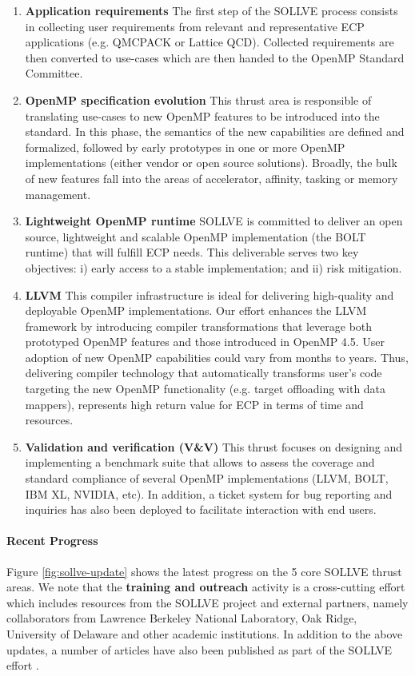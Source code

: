 \begin{enumerate}
\item {\bf Application requirements}
The first step of the SOLLVE process consists in collecting user requirements
from relevant and representative ECP applications (e.g. QMCPACK or Lattice QCD).
Collected requirements are then converted to use-cases which are then handed
to the OpenMP Standard Committee.
\item {\bf OpenMP specification evolution}
This thrust area is responsible of translating use-cases to new OpenMP
features to be introduced into the standard. In this phase, the semantics
of the new capabilities are defined and formalized, followed by early
prototypes in one or more OpenMP implementations (either vendor or open
source solutions). Broadly, the bulk of new features fall into the areas
of accelerator, affinity, tasking or memory management.
\item {\bf Lightweight OpenMP runtime}
SOLLVE is committed to deliver an open source, lightweight and scalable
OpenMP implementation (the BOLT runtime) that will fulfill ECP needs.
This deliverable serves two key objectives: i) early access to a stable 
implementation; and ii) risk mitigation.
\item {\bf LLVM }
This compiler infrastructure is ideal for 
delivering high-quality and deployable OpenMP implementations.
Our effort enhances the LLVM framework by introducing compiler transformations
that leverage both prototyped OpenMP features and those introduced
in OpenMP 4.5. User adoption of new OpenMP capabilities could vary from
months to years. Thus, delivering compiler technology that automatically transforms
user's code targeting the new OpenMP functionality (e.g. target offloading with
data mappers), represents high return value for ECP in terms of time and
resources. 
\item {\bf Validation and verification (V\&V)} This thrust focuses on
designing and implementing a benchmark suite that allows to assess the coverage
and standard compliance of several OpenMP implementations (LLVM, BOLT, IBM XL,
NVIDIA, etc). In addition, a ticket system for bug reporting and inquiries has
also been deployed to facilitate interaction with end users.
\end{enumerate}

\paragraph{Recent Progress}
Figure \ref{fig:sollve-update} shows the latest progress on the 5 core SOLLVE
thrust areas. We note that the {\bf training and outreach} activity is a
cross-cutting effort which includes resources from the SOLLVE project and
external partners, namely collaborators from Lawrence Berkeley National
Laboratory, Oak Ridge, University of Delaware and other academic institutions.
In addition to the above updates, a number of articles have also been published
as part of the SOLLVE effort \cite{openmp-tr6,zinenko.cc.2018,osti_1429981,DBLP:conf/sc/MishraLKFC17}.

